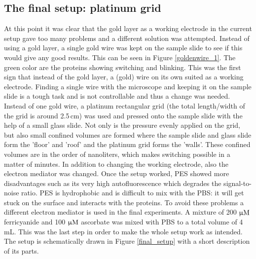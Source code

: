 \documentclass[twoside,single]{lion-msc}
\begin{document}
\subsection*{The final setup: platinum grid} \label{grid_1}
At this point it was clear that the gold layer as a working electrode in the current setup gave too many problems and a different solution was attempted. Instead of using a gold layer, a single gold wire was kept on the sample slide to see if this would give any good results. This can be seen in Figure \ref{goldenwire_1}. The green color are the proteins showing switching and blinking. This was the first sign that instead of the gold layer, a (gold) wire on its own suited as a working electrode. Finding a single wire with the microscope and keeping it on the sample slide is a tough task and is not controllable and thus a change was needed. Instead of one gold wire, a platinum rectangular grid (the total length/width of the grid is around 2.5\,cm) was used and pressed onto the sample slide with the help of a small glass slide. Not only is the pressure evenly applied on the grid, but also small confined volumes are formed where the sample slide and glass slide form the 'floor' and 'roof' and the platinum grid forms the 'walls'. These confined volumes are in the order of nanoliters, which makes switching possible in a matter of minutes. In addition to changing the working electrode, also the electron mediator was changed. Once the setup worked, PES showed more disadvantages such as its very high autofluorescence which degrades the signal-to-noise ratio. PES is hydrophobic and is difficult to mix with the PBS: it will get stuck on the surface and interacts with the proteins. To avoid these problems a different electron mediator is used in the final experiments. A mixture of 200 $\upmu \textup{M}$ ferricyanide and 100 $\upmu \textup{M}$ ascorbate was mixed with PBS to a total volume of 4 mL. This was the last step in order to make the whole setup work as intended. The setup is schematically drawn in Figure \ref{final_setup} with a short description of its parts.
\end{document}
